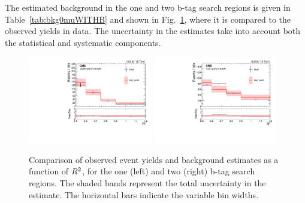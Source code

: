 The estimated background in the one and two b-tag search regions
is given in Table~\ref{tab:bkg0muWITHB} and shown in Fig.~\ref{fig:0muttbar}, where it is compared to
the observed yields in data. The uncertainty in the
estimates take into account both the statistical and systematic
components.%
\begin{figure}
   \includegraphics[width=0.48\textwidth]{BtagPlots/Bkg_0mu2TbEXC_CP.pdf}
   \includegraphics[width=0.48\textwidth]{BtagPlots/Bkg_0mu1TbEXC_CP.pdf}
 \caption{Comparison of observed event yields and background
   estimates as a function of $R^2$, for the
   one (left) and two (right) b-tag search regions.
   The shaded bands represent the total uncertainty in the estimate. The horizontal bars indicate
the variable bin widths.\label{fig:0muttbar}}
\end{figure}
\begin{table}
\centering
\end{table}





